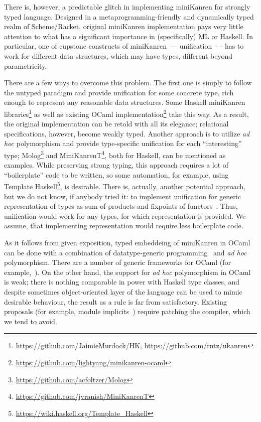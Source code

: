 \documentclass[10pt, oneside, nocopyrightspace]{sigplanconf}
\begin{document}
There is, however, a predictable glitch in implementing miniKanren for strongly typed language. 
Designed in a metaprogramming-friendly and dynamically typed realm of Scheme/Racket, original 
miniKanren implementation pays very little attention to what has a significant importance in (specifically) 
ML or Haskell. In particular, one of cupstone constructs of miniKanren~--- unification~--- has to work for 
different data structures, which may have types, different beyond parametricity.

There are a few ways to overcome this problem. The first one is simply to follow the untyped paradigm and
provide unification for some concrete type, rich enough to represent any reasonable data structures.
Some Haskell miniKanren libraries\footnote{\url{https://github.com/JaimieMurdock/HK}, \url{https://github.com/rntz/ukanren}}
as well as existing OCaml implementation\footnote{\url{https://github.com/lightyang/minikanren-ocaml}} take this way. 
As a result, the original implementation can be retold with all its elegance; relational specifications, however,
become weakly typed. Another approach is to utilize \emph{ad hoc} polymorphism and provide type-specific
unification for each ``interesting'' type; Molog\footnote{\url{https://github.com/acfoltzer/Molog}} and 
MiniKanrenT\footnote{\url{https://github.com/jvranish/MiniKanrenT}}, both for Haskell, can be mentioned as examples.
While preserving strong typing, this approach requires a lot of ``boilerplate'' code to be written, so some
automation, for example, using Template Haskell\footnote{\url{https://wiki.haskell.org/Template_Haskell}},
is desirable. There is, actually, another potential approach, but we do not know, if anybody tried
it: to implement unification for generic representation of types as sum-of-products and fixpoints of 
functors~\cite{InstantGenerics, ALaCarte}. Thus, unification would work for any types, for which representation
is provided. We assume, that implementing representation would require less boilerplate code.

As it follows from given exposition, typed embeddeing of miniKanren in OCaml can be done with
a combination of datatype-generic programming~\cite{DGP} and \emph{ad hoc} polymorphism. There are a 
number of generic frameworks for OCaml (for example,~\cite{Deriving}). On the other hand, the support
for \emph{ad hoc} polymorphism in OCaml is weak; there is nothing comparable in power with Haskell 
type classes, and despite sometimes object-oriented layer of the language can be used to mimic
desirable behaviour, the result as a rule is far from satisfactory. Existing proposals (for example, 
module implicits~\cite{Implicits}) require patching the compiler, which we tend to avoid.
\end{document}

